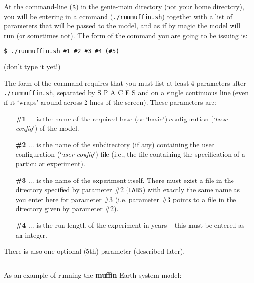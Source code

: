 \documentclass[11pt,fleqn]{book} %
\begin{document}
At the command-line (\texttt{\$}) in the genie-main directory (not your home directory), you will be entering in a command (\texttt{./runmuffin.sh}) together with a list of parameters that will be passed to the model, and as if by magic the model will run (or sometimes not). The form of the command you are going to be issuing is:

\vspace{-1mm}
\begin{verbatim}
$ ./runmuffin.sh #1 #2 #3 #4 (#5)
\end{verbatim}
\vspace{-1mm}

\noindent(\uline{don't type it yet}!)

\vspace{1mm}
The form of the command requires that you must list at least 4 parameters after \texttt{./runmuffin.sh}, separated by S P A C E S and on a single continuous line (even if it ‘wraps’ around across 2 lines of the screen).
These parameters are:

\vspace{2mm}
\begin{enumerate}[noitemsep]
\setlength{\itemindent}{.2in}
\item[\textbf{\#1}] ... is the name of the required base (or ‘basic’) configuration (‘\textit{base-config}’) of the model.
\item[\textbf{\#2}] ... is the name of the subdirectory (if any) containing the user configuration (‘\textit{user-config}’) file (i.e., the file containing the specification of a particular experiment).
\item[\textbf{\#3}] ... is the name of the experiment itself. There must exist a file in the directory specified by parameter \#2 (\texttt{LABS}) with exactly the same name as you enter here for parameter \#3 (i.e. parameter \#3 points to a file in the directory given by parameter \#2).
\item[\textbf{\#4}] ... is the run length of the experiment in years – this must be entered as an integer.
\end{enumerate}

There is also one optional (5th) parameter (described later).

\vspace{1mm}
\noindent\rule{4cm}{0.1mm}
\vspace{2mm}

\noindent As an example of running the \textbf{muffin} Earth system model:
\end{document}
